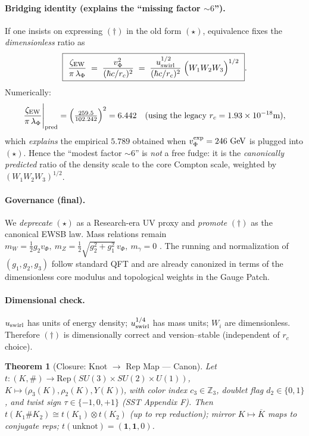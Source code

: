 \documentclass[11pt]{article}
\newtheorem{theorem}{Theorem}[section]
\begin{document}
\paragraph{Bridging identity (explains the ``missing factor $\sim 6$'').}
    If one insists on expressing $(\dagger)$ in the old form $(\star)$, equivalence fixes the \emph{dimensionless} ratio as
    \[
        \boxed{\ \frac{\zeta_{\rm EW}}{\pi\,\lambda_\Phi}\;=\;
        \frac{v_\Phi^2}{(\hbar c/r_c)^2}
        \;=\;
        \frac{u_{\rm swirl}^{1/2}}{(\hbar c/r_c)^2}\;\Big(W_1W_2W_3\Big)^{1/2}\ }.
    \]
    Numerically:
    \[
        \frac{\zeta_{\rm EW}}{\pi\,\lambda_\Phi}\Bigg|_{\text{pred}}
        =\Big(\tfrac{259.5}{102.242}\Big)^2
        =6.442\quad\text{(using the legacy }r_c=1.93\times 10^{-18}\mathrm{m}),
    \]
    which \emph{explains} the empirical $5.789$ obtained when $v_\Phi^{\rm exp}=246~\mathrm{GeV}$ is plugged into $(\star)$.
    Hence the ``modest factor $\sim 6$'' is \emph{not} a free fudge: it is the \emph{canonically predicted}
    ratio of the density scale to the core Compton scale, weighted by $(W_1W_2W_3)^{1/2}$.

\paragraph{Governance (final).}
    We \emph{deprecate} $(\star)$ as a Research-era UV proxy and \emph{promote} $(\dagger)$ as the canonical EWSB law.
    Mass relations remain
    \(
    m_W=\tfrac12 g_2 v_\Phi,\
    m_Z=\tfrac12\sqrt{g_2^2+g_1^2}\,v_\Phi,\
    m_\gamma=0
    \)
    \cite{Weinberg1967,EnglertBrout1964,Higgs1964}.
    The running and normalization of $(g_1,g_2,g_3)$ follow standard QFT \cite{PeskinSchroeder,WeinbergQFT2,PDG2024} and are already canonized
    in terms of the dimensionless core modulus and topological weights in the Gauge Patch.

\paragraph{Dimensional check.}
    $u_{\rm swirl}$ has units of energy density; $u_{\rm swirl}^{1/4}$ has mass units; $W_i$ are dimensionless.
    Therefore $(\dagger)$ is dimensionally correct and version–stable (independent of $r_c$ choice).


    \begin{theorem}[Closure: Knot $\to$ Rep Map — Canon]
    Let $t:(K,\#)\!\to\!\mathrm{Rep}(SU(3)\!\times\!SU(2)\!\times\!U(1))$,
    $K\mapsto\big(\rho_3(K),\rho_2(K),Y(K)\big)$, with color index $c_3\!\in\!\mathbb Z_3$,
    doublet flag $d_2\!\in\!\{0,1\}$, and twist sign $\tau\!\in\!\{-1,0,+1\}$ (SST Appendix F).
    Then $t(K_1\#K_2)\!\cong\!t(K_1)\!\otimes\!t(K_2)$ (up to rep reduction); mirror $K\!\mapsto\!\overline K$
    maps to conjugate reps; $t(\text{unknot})=(\mathbf 1,\mathbf 1,0)$.
\end{theorem}
\end{document}
